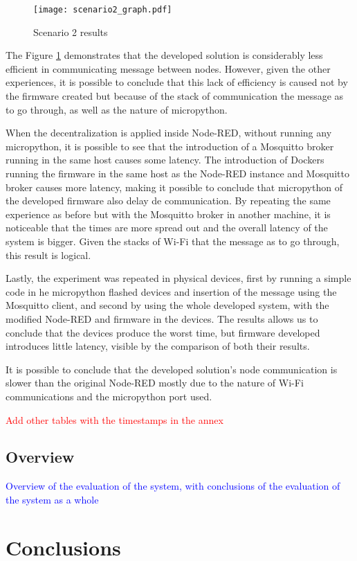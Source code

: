\begin{figure}[h]
\centering
\texttt{[image: scenario2\_graph.pdf]}
\caption[Scenario 2 results]{Scenario 2 results}\label{fig:scenario2_candlestick}
\end{figure}

The Figure \ref{fig:scenario2_candlestick} demonstrates that the developed solution is considerably less efficient in communicating message between nodes. However, given the other experiences, it is possible to conclude that this lack of efficiency is caused not by the firmware created but because of the stack of communication the message as to go through, as well as the nature of micropython. 

When the decentralization is applied inside Node-RED, without running any micropython, it is possible to see that the introduction of a Mosquitto broker running in the same host causes some latency. The introduction of Dockers running the firmware in the same host as the Node-RED instance and Mosquitto broker causes more latency, making it possible to conclude that micropython of the developed firmware also delay de communication. By repeating the same experience as before but with the Mosquitto broker in another machine, it is noticeable that the times are more spread out and the overall latency of the system is bigger. Given the stacks of Wi-Fi that the message as to go through, this result is logical.

Lastly, the experiment was repeated in physical devices, first by running a simple code in he micropython flashed devices and insertion of the message using the Mosquitto client, and second by using the whole developed system, with the modified Node-RED and firmware in the devices. The results allows us to conclude that the devices produce the worst time, but firmware developed introduces little latency, visible by the comparison of both their results.

It is possible to conclude that the developed solution's node communication is slower than the original Node-RED mostly due to the nature of Wi-Fi communications and the micropython port used.   

\textcolor{red}{Add other tables with the timestamps in the annex}

\subsection{Overview}\label{sec:discussion_overview}

\textcolor{blue}{Overview of the evaluation of the system, with conclusions of the evaluation of the system as a whole}

\section{Conclusions}\label{sec:evaluation_conclusions}

